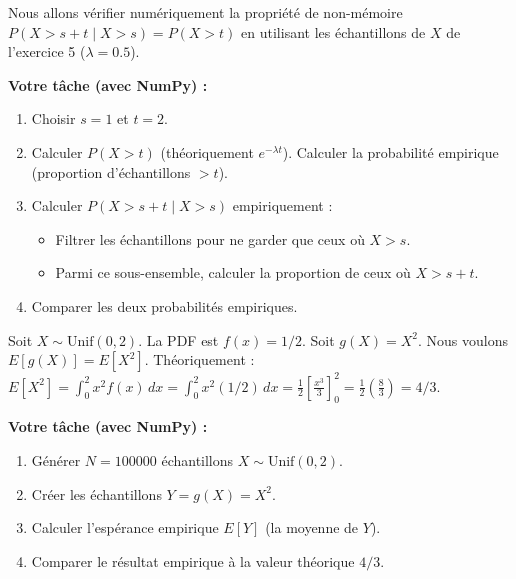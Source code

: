 \begin{exercicebox}
Nous allons vérifier numériquement la propriété de non-mémoire $P(X > s+t \mid X > s) = P(X > t)$ en utilisant les échantillons de $X$ de l'exercice 5 ($\lambda=0.5$).

\textbf{Votre tâche (avec NumPy) :}
\begin{enumerate}
    \item Choisir $s=1$ et $t=2$.
    \item Calculer $P(X > t)$ (théoriquement $e^{-\lambda t}$). Calculer la probabilité empirique (proportion d'échantillons $> t$).
    \item Calculer $P(X > s+t \mid X > s)$ empiriquement :
        \begin{itemize}
            \item Filtrer les échantillons pour ne garder que ceux où $X > s$.
            \item Parmi ce sous-ensemble, calculer la proportion de ceux où $X > s+t$.
        \end{itemize}
    \item Comparer les deux probabilités empiriques.
\end{enumerate}
\end{exercicebox}

\begin{exercicebox}
Soit $X \sim \text{Unif}(0, 2)$. La PDF est $f(x)=1/2$.
Soit $g(X) = X^2$. Nous voulons $E[g(X)] = E[X^2]$.
Théoriquement : $E[X^2] = \int_0^2 x^2 f(x) \, dx = \int_0^2 x^2 (1/2) \, dx = \frac{1}{2} [\frac{x^3}{3}]_0^2 = \frac{1}{2} (\frac{8}{3}) = 4/3$.

\textbf{Votre tâche (avec NumPy) :}
\begin{enumerate}
    \item Générer $N=100000$ échantillons $X \sim \text{Unif}(0, 2)$.
    \item Créer les échantillons $Y = g(X) = X^2$.
    \item Calculer l'espérance empirique $E[Y]$ (la moyenne de $Y$).
    \item Comparer le résultat empirique à la valeur théorique $4/3$.
\end{enumerate}
\end{exercicebox}

